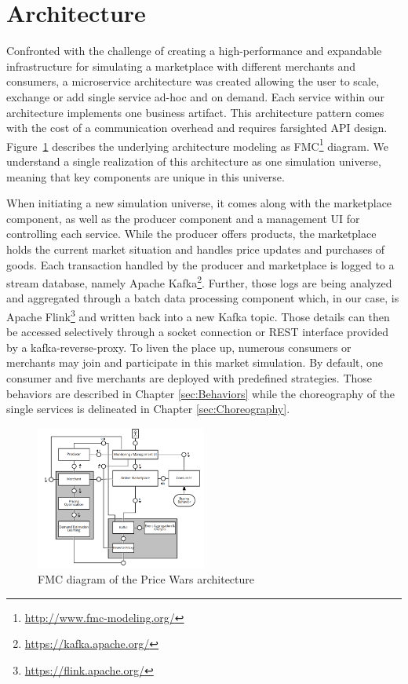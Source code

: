 \section{Architecture}
\label{sec:Architecture}
%
Confronted with the challenge of creating a high-performance and expandable infrastructure for simulating a marketplace with different merchants and consumers, a microservice architecture was created allowing the user to scale, exchange or add single service ad-hoc and on demand. Each service within our architecture implements one business artifact. This architecture pattern comes with the cost of a communication overhead and requires farsighted API design.\\

Figure~\ref{fig:fmc} describes the underlying architecture modeling as FMC\footnote{\url{http://www.fmc-modeling.org/}} diagram. We understand a single realization of this architecture as one simulation universe, meaning that key components are unique in this universe. 

When initiating a new simulation universe, it comes along with the marketplace component, as well as the producer component and a management UI for controlling each service. While the producer offers products, the marketplace holds the current market situation and handles price updates and purchases of goods. Each transaction handled by the producer and marketplace is logged to a stream database, namely Apache Kafka\footnote{\url{https://kafka.apache.org/}}. Further, those logs are being analyzed and aggregated through a batch data processing component which, in our case, is Apache Flink\footnote{\url{https://flink.apache.org/}} and written back into a new Kafka topic. Those details can then be accessed selectively through a socket connection or REST interface provided by a kafka-reverse-proxy. 
To liven the place up, numerous consumers or merchants may join and participate in this market simulation. By default, one consumer and five merchants are deployed with predefined strategies. Those behaviors are described in Chapter \ref{sec:Behaviors} while the choreography of the single services is delineated in Chapter \ref{sec:Choreography}.

%
\begin{figure}[h]
    \centering
    \includegraphics[width=0.5\textwidth]{images/architecture_fmc.png}
    \caption{FMC diagram of the Price Wars architecture}
    \label{fig:fmc}
\end{figure}
%